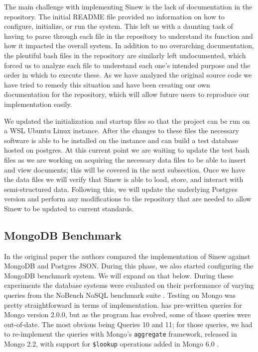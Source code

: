 \documentclass[sigconf]{acmart}
\begin{document}
    The main challenge with implementing Sinew is the lack of documentation in the repository. The initial README file provided no information on how to configure, initialize, or run the system. This left us with a daunting task of having to parse through each file in the repository to understand its function and how it impacted the overall system. In addition to no overarching documentation, the plentiful bash files in the repository are similarly left undocumented, which forced us to analyze each file to understand each one's intended purpose and the order in which to execute these. As we have analyzed the original source code we have tried to remedy this situation and have been creating our own documentation for the repository, which will allow future users to reproduce our implementation easily.

    We updated the initialization and startup files so that the project can be run on a WSL Ubuntu Linux instance. After the changes to these files the necessary software is able to be installed on the instance and can build a test database hosted on postgres. At this current point we are waiting to update the test bash files as we are working on acquiring the necessary data files to be able to insert and view documents; this will be covered in the next subsection. Once we have the data files we will verify that Sinew is able to load, store, and interact with semi-structured data. Following this, we will update the underlying Postgres version and perform any modifications to the repository that are needed to allow Sinew to be updated to current standards.

    \subsection{MongoDB Benchmark}
    In the original paper the authors compared the implementation of Sinew against MongoDB and Postgres JSON. During this phase, we also started configuring the MongoDB benchmark system. We will expand on that below. During these experiments the database systems were evaluated on their performance of varying queries from the NoBench NoSQL benchmark suite \cite{NoSQLBench}. Testing on Mongo was pretty straightforward in terms of implementation. \cite{NoSQLBench} has pre-written queries for Mongo version 2.0.0, but as the program has evolved, some of those queries were out-of-date. The most obvious being Queries 10 and 11; for those queries, we had to re-implement the queries with Mongo's \texttt{aggregate} framework, released in Mongo 2.2, with support for \texttt{\$lookup} operations added in Mongo 6.0  \cite{Done2023}.
\end{document}
